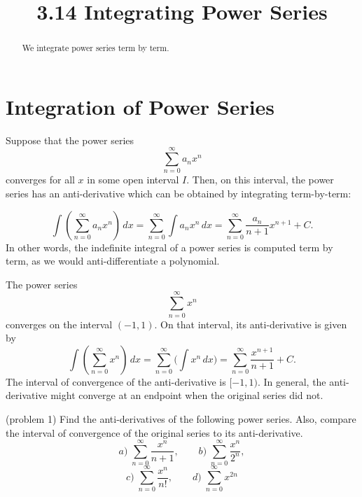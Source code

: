 \documentclass[handout]{ximera}
\title{3.14 Integrating Power Series}
\begin{document}
\begin{abstract}
We integrate power series term by term.
\end{abstract}

\maketitle

\section{Integration of Power Series}


Suppose that the power series 
\[
\sum_{n=0}^\infty a_n x^n
\]
converges for all $x$ in some open interval $I$. Then, on this interval, the power series has an anti-derivative which can be obtained by integrating term-by-term:


\[
\int \left( \sum_{n=0}^\infty a_n x^n \right) \, dx  = \sum_{n=0}^\infty  \int a_n x^n \, dx   
= \sum_{n=0}^\infty   \frac{a_n}{n+1} x^{n+1} + C.
\]
In other words, the indefinite integral of a power series is computed term by term, as we would anti-differentiate a polynomial.

\begin{example}[example 1]
The power series 
\[
\sum_{n=0}^\infty x^n
\]
converges on the interval $(-1, 1)$.
On that interval, its anti-derivative is given by
\[
\int\left( \sum_{n=0}^\infty x^n \right) \, dx= \sum_{n=0}^\infty  \big(\int x^n \, dx\big) = \sum_{n=0}^\infty \frac{x^{n+1}}{n+1} + C.
\]
The interval of convergence of the anti-derivative is $[-1,1)$. In general, 
the anti-derivative might converge at an endpoint when the original series did not.
\end{example}



\begin{problem}(problem 1)
Find the anti-derivatives of the following power series. 
Also, compare the interval of convergence of the original series to its anti-derivative.
\[
a) \; \sum_{n=0}^\infty \frac{x^n}{n+1},\qquad b) \; \sum_{n=0}^\infty \frac{x^n}{2^n},
\]
\[
c) \;  \sum_{n=0}^\infty \frac{x^n}{n!},\qquad d) \; \sum_{n=0}^\infty x^{2n}
\]
\end{problem}
\end{document}
